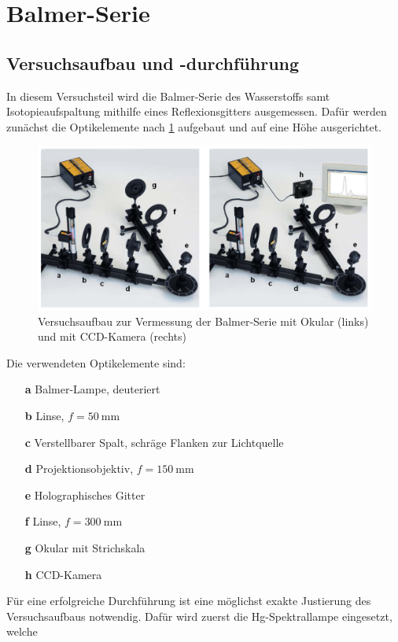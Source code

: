 \section{Balmer-Serie}\label{sec:balmer}
\subsection{Versuchsaufbau und -durchführung}\label{subsec:balmer_durchfuhrung}
In diesem Versuchsteil wird die Balmer-Serie des Wasserstoffs samt Isotopieaufspaltung mithilfe eines Reflexionsgitters ausgemessen.
Dafür werden zunächst die Optikelemente nach \cref{fig:balmer_aufbau} aufgebaut und auf eine Höhe ausgerichtet.
\begin{figure}[H]
	\centering
	\includegraphics[width=0.8\linewidth]{../figs/balmer_aufbau}
	\caption{Versuchsaufbau zur Vermessung der Balmer-Serie mit Okular (links) und mit CCD-Kamera (rechts) \cite{skript}}
	\label{fig:balmer_aufbau}
\end{figure} Die verwendeten Optikelemente sind:
\begin{itemize}
    \item[\textbf{a}] Balmer-Lampe, deuteriert
    \item[\textbf{b}] Linse, $f = \SI{50}{\milli \meter}$
    \item[\textbf{c}] Verstellbarer Spalt, schräge Flanken zur Lichtquelle
    \item[\textbf{d}] Projektionsobjektiv, $f = \SI{150}{\milli \meter}$
    \item[\textbf{e}] Holographisches Gitter
    \item[\textbf{f}] Linse, $f = \SI{300}{\milli \meter}$
    \item[\textbf{g}] Okular mit Strichskala
    \item[\textbf{h}] CCD-Kamera      
\end{itemize}
Für eine erfolgreiche Durchführung ist eine möglichst exakte Justierung des Versuchsaufbaus notwendig. Dafür wird zuerst die Hg-Spektrallampe eingesetzt, welche

